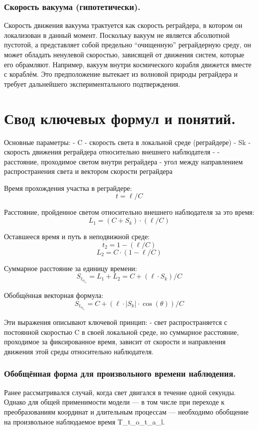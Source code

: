 \documentclass[12pt]{article}
\begin{document}
\subsubsection*{Скорость вакуума (гипотетически).}
Скорость движения вакуума трактуется как скорость реграйдера, в котором он локализован в данный момент. Поскольку вакуум не является абсолютной пустотой, а представляет собой предельно “очищенную” реграйдерную среду, он может обладать ненулевой скоростью, зависящей от движения систем, которые его обрамляют. Например, вакуум внутри космического корабля движется вместе с кораблём. Это предположение вытекает из волновой природы реграйдера и требует дальнейшего экспериментального подтверждения.

\section*{Свод ключевых формул и понятий.}

Основные параметры:
- C - скорость света в локальной среде (реграйдере)
- Sk - скорость движения реграйдера относительно внешнего наблюдателя
- \ell - расстояние, проходимое светом внутри реграйдера
- \theta угол между направлением распространения света и вектором скорости реграйдера

Время прохождения участка в реграйдере:
\[
t = \ell / C
\]

Расстояние, пройденное светом относительно внешнего наблюдателя за это время:
\[
L_1 = (C + S_k) \cdot (\ell / C)
\]

Оставшееся время и путь в неподвижной среде:
\[
t_2 = 1 - (\ell / C)
\]
\[
L_2 = C \cdot (1 - \ell / C)
\]

Суммарное расстояние за единицу времени:
\[
S_t_o_t_a_l = L_1 + L_2 = C + (\ell \cdot S_k) / C
\]

Обобщённая векторная формула:
\[
S_t_o_t_a_l = C + (\ell \cdot \left|S_k\right| \cdot \cos(\theta)) / C
\]

Эти выражения описывают ключевой принцип:
- свет распространяется с постоянной скоростью C в своей локальной среде, но суммарное расстояние, проходимое за фиксированное время, зависит от скорости и направления движения этой среды относительно наблюдателя.

\subsubsection*{Обобщённая форма для произвольного времени наблюдения.}
Ранее рассматривался случай, когда свет двигался в течение одной секунды. Однако для общей применимости модели — в том числе при переходе к преобразованиям координат и длительным процессам — необходимо обобщение на произвольное наблюдаемое время T_t_o_t_a_l.
\end{document}
